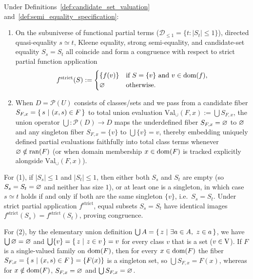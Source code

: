\begin{theorem}
\label{thm:semi_equality_congruence_and_union_bridge}
Under Definitions~\ref{def:candidate_set_valuation} and~\ref{def:semi_equality_specification}:
\begin{enumerate}
\item On the subuniverse of functional partial terms ($\mathcal{D}_{\le 1} = \{t : |S_t| \le 1\}$), directed quasi-equality $s \simeq t$, Kleene equality, strong semi-equality, and candidate-set equality $S_s = S_t$ all coincide and form a congruence with respect to strict partial function application
\[
f^{\mathrm{strict}}(S) := \begin{cases} \{f(v)\} & \text{if } S = \{v\} \text{ and } v \in \mathrm{dom}(f), \\ \varnothing & \text{otherwise.} \end{cases}
\]
\item When $D = \mathcal{P}(U)$ consists of classes/sets and we pass from a candidate fiber $S_{F,x} = \left\{\,s\ \middle|\ (x, s) \in F\,\right\}$ to total union evaluation $\mathrm{Val}_{\cup}(F, x) := \bigcup S_{F,x}$, the union operator $\bigcup : \mathcal{P}(D) \to D$ maps the underdefined fiber $S_{F,x} = \varnothing$ to $\varnothing$ and any singleton fiber $S_{F,x} = \{v\}$ to $\bigcup \{v\} = v$, thereby embedding uniquely defined partial evaluations faithfully into total class terms whenever $\varnothing \notin \operatorname{ran}(F)$ (or when domain membership $x \in \mathrm{dom}(F)$ is tracked explicitly alongside $\mathrm{Val}_{\cup}(F, x)$).
\end{enumerate}
\end{theorem}
\Proof
For (1), if $|S_s| \le 1$ and $|S_t| \le 1$, then either both $S_s$ and $S_t$ are empty (so $S_s = S_t = \varnothing$ and neither has size $1$), or at least one is a singleton, in which case $s \simeq t$ holds if and only if both are the same singleton $\{v\}$, i.e.\ $S_s = S_t$. Under strict partial application $f^{\mathrm{strict}}$, equal subsets $S_s = S_t$ have identical images $f^{\mathrm{strict}}(S_s) = f^{\mathrm{strict}}(S_t)$, proving congruence.

For (2), by the elementary union definition $\bigcup A = \left\{\,z\ \middle|\ \exists a \in A,\ z \in a\,\right\}$, we have $\bigcup \varnothing = \varnothing$ and $\bigcup \{v\} = \left\{\,z\ \middle|\ z \in v\,\right\} = v$ for every class $v$ that is a set ($v \in \mathrm{V}$). If $F$ is a single-valued family on $\mathrm{dom}(F)$, then for every $x \in \mathrm{dom}(F)$ the fiber $S_{F,x} = \left\{\,s\ \middle|\ (x, s) \in F\,\right\} = \{F(x)\}$ is a singleton set, so $\bigcup S_{F,x} = F(x)$, whereas for $x \notin \mathrm{dom}(F)$, $S_{F,x} = \varnothing$ and $\bigcup S_{F,x} = \varnothing$.
\Done


